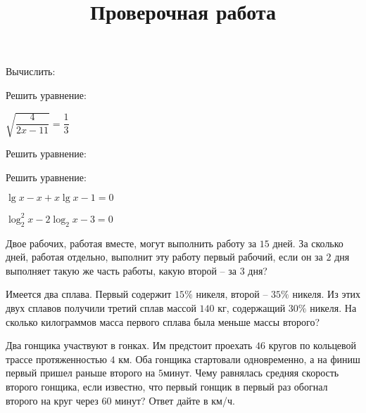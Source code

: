 \newpage
\title{Проверочная работа}
\begin{listofex}
	\item Вычислить:
	\begin{enumcols}[itemcolumns=2]
		\item {}
		\item {}
		\item {}
		\item {}
		\item {}
		\item {}
		\item {}
		\item {}
	\end{enumcols}
	\item Решить уравнение:
	\begin{enumcols}[itemcolumns=2]
		\item {}
		\item {}
		\item {}
		\item \( \sqrt{\dfrac{4}{2x-11}}=\dfrac{1}{3} \)
	\end{enumcols}
	\item Решить уравнение:
	\begin{enumcols}[itemcolumns=3]
		\item {}
		\item {}
		\item {}
	\end{enumcols}
	\item Решить уравнение:
	\begin{enumcols}[itemcolumns=2]
		\item {}
		\item {}
		\item {}
		\item {}
		\item \( \lg x - x + x\lg x - 1 = 0 \)
		\item \( \log^2_2x-2\log_2 x - 3 = 0 \)
	\end{enumcols}
	\item Двое рабочих, работая вместе, могут выполнить работу за \( 15 \) дней. За сколько дней, работая отдельно, выполнит эту работу первый  рабочий, если он за \(  2 \) дня выполняет такую же часть работы, какую второй – за \( 3 \) дня?
	\item Имеется два сплава. Первый содержит \( 15\% \) никеля, второй – \( 35\% \) никеля. Из этих двух сплавов получили третий сплав массой \( 140 \) кг, содержащий \( 30\%  \) никеля. На сколько килограммов масса первого сплава была меньше массы второго?
	\item Два гонщика участвуют в гонках. Им предстоит проехать \(46\) кругов по кольцевой трассе протяженностью \(4\) км. Оба гонщика стартовали одновременно, а на финиш первый пришел раньше второго на \(5\)минут. Чему равнялась средняя скорость второго гонщика, если известно, что первый гонщик в первый раз обогнал второго на круг через \(60\) минут? Ответ дайте в км/ч.
\end{listofex}